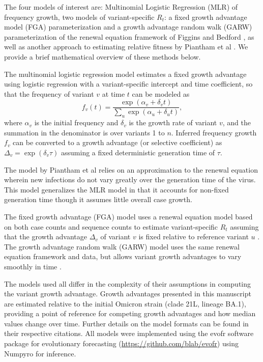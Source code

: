 \documentclass[10pt,letterpaper]{article}
\begin{document}
The four models of interest are: Multinomial Logistic Regression (MLR) of frequency growth, two models of variant-specific $R_t$: a fixed growth advantage model (FGA) parameterization and a growth advantage random walk (GARW) parameterization of the renewal equation framework of Figgins and Bedford \cite{figgins2022sars}, as well as another approach to estimating relative fitness by Piantham et al \cite{piantham2021estimating}.
We provide a brief mathematical overview of these methods below.

The multinomial logistic regression model estimates a fixed growth advantage using logistic regression with a variant-specific intercept and time coefficient, so that the frequency of variant $v$ at time $t$ can be modeled as
\begin{equation}
    f_{v}(t) = \frac{\exp(\alpha_{v} + \delta_{v} t)}{\sum_{u} \exp(\alpha_{u} + \delta_{u} t)},
\end{equation}
where $\alpha_v$ is the initial frequency and $\delta_v$ is the growth rate of variant $v$, and the summation in the denominator is over variants 1 to $n$.
Inferred frequency growth $f_v$ can be converted to a growth advantage (or selective coefficient) as $\Delta_{v} = \exp(\delta_{v} \tau)$ assuming a fixed deterministic  generation time of $\tau$.

The model by Piantham et al \cite{piantham2021estimating} relies on an approximation to the renewal equation wherein new infections do not vary greatly over the generation time of the virus.
This model generalizes the MLR model in that it accounts for non-fixed generation time though it assumes little overall case growth.

The fixed growth advantage (FGA) model uses a renewal equation model based on both case counts and sequence counts to estimate variant-specific $R_t$ assuming that the growth advantage $\Delta_{v}$ of variant $v$ is fixed relative to reference variant $u$ \cite{figgins2022sars}.
The growth advantage random walk (GARW) model uses the same renewal equation framework and data, but allows variant growth advantages to vary smoothly in time \cite{figgins2022sars}.

The models used all differ in the complexity of their assumptions in computing the variant growth advantage.
Growth advantages presented in this manuscript are estimated relative to the initial Omicron strain (clade 21L, lineage BA.1), providing a point of reference for competing growth advantages and how median values change over time.
Further details on the model formats can be found in their respective citations.
All models were implemented using the evofr software package for evolutionary forecasting (\href{https://github.com/blab/evofr}{https://github.com/blab/evofr}) using Numpyro for inference.
\end{document}
